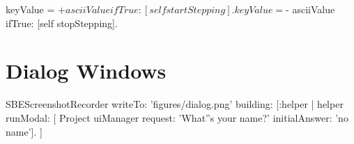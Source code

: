 \documentclass[a4paper,10pt,twoside]{book}
\begin{document}

\begin{code}{}
	keyValue = $+ asciiValue 
		ifTrue: [self startStepping].
	keyValue = $- asciiValue
		ifTrue: [self stopStepping].
\end{code}


\section{Dialog Windows}

\begin{ExecuteSmalltalkScript}
SBEScreenshotRecorder writeTo: 'figures/dialog.png' building: [:helper |
	helper runModal: [
		Project uiManager
			request: 'What''s your name?'
			initialAnswer: 'no name'].
]
\end{ExecuteSmalltalkScript}
\end{document}
